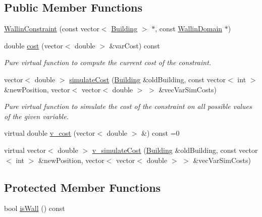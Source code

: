 \subsection*{Public Member Functions}
\begin{DoxyCompactItemize}
\item 
\hyperlink{classghost_1_1WallinConstraint_a943d4dcca2afb3cd72cb1049a7f197ff}{Wallin\-Constraint} (const vector$<$ \hyperlink{classghost_1_1Building}{Building} $>$ $\ast$, const \hyperlink{classghost_1_1WallinDomain}{Wallin\-Domain} $\ast$)
\item 
double \hyperlink{classghost_1_1WallinConstraint_a26fde30aa60cc596b8f8550905ac030f}{cost} (vector$<$ double $>$ \&var\-Cost) const 
\begin{DoxyCompactList}\small\item\em Pure virtual function to compute the current cost of the constraint. \end{DoxyCompactList}\item 
vector$<$ double $>$ \hyperlink{classghost_1_1WallinConstraint_ac6df6c03a6f0b026e78e1ce7f20c25b5}{simulate\-Cost} (\hyperlink{classghost_1_1Building}{Building} \&old\-Building, const vector$<$ int $>$ \&new\-Position, vector$<$ vector$<$ double $>$ $>$ \&vec\-Var\-Sim\-Costs)
\begin{DoxyCompactList}\small\item\em Pure virtual function to simulate the cost of the constraint on all possible values of the given variable. \end{DoxyCompactList}\item 
virtual double \hyperlink{classghost_1_1WallinConstraint_aef93d84e063f20ffeb3ff584fe6fabad}{v\-\_\-cost} (vector$<$ double $>$ \&) const =0
\item 
virtual vector$<$ double $>$ \hyperlink{classghost_1_1WallinConstraint_a94c5757e9bd0ccfc947eaf23ae7a33ed}{v\-\_\-simulate\-Cost} (\hyperlink{classghost_1_1Building}{Building} \&old\-Building, const vector$<$ int $>$ \&new\-Position, vector$<$ vector$<$ double $>$ $>$ \&vec\-Var\-Sim\-Costs)
\end{DoxyCompactItemize}
\subsection*{Protected Member Functions}
\begin{DoxyCompactItemize}
\item 
bool \hyperlink{classghost_1_1WallinConstraint_a80602ec8462dad6adfcd7bfa7668e83d}{is\-Wall} () const 
\end{DoxyCompactItemize}
